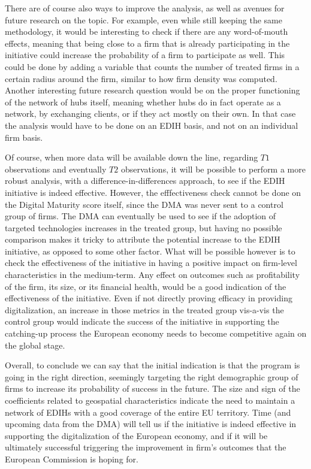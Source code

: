 \documentclass[12pt]{report}
\begin{document}
\par There are of course also ways to improve the analysis, as well as avenues for future research on the topic. For example, even while still keeping the same methodology, it would be interesting to check if there are any word-of-mouth effects, meaning that being close to a firm that is already participating in the initiative could increase the probability of a firm to participate as well. This could be done by adding a variable that counts the number of treated firms in a certain radius around the firm, similar to how firm density was computed. Another interesting future research question would be on the proper functioning of the network of hubs itself, meaning whether hubs do in fact operate as a network, by exchanging clients, or if they act mostly on their own. In that case the analysis would have to be done on an EDIH basis, and not on an individual firm basis. 
\par Of course, when more data will be available down the line, regarding $T1$ observations and eventually $T2$ observations, it will be possible to perform a more robust analysis, with a difference-in-differences approach, to see if the EDIH initiative is indeed effective. However, the efffectiveness check cannot be done on the Digital Maturity score itself, since the DMA was never sent to a control group of firms. The DMA can eventually be used to see if the adoption of targeted technologies increases in the treated group, but having no possible comparison makes it tricky to attribute the potential increase to the EDIH initiative, as opposed to some other factor.
What will be possible however is to check the effectiveness of the initiative in having a positive impact on firm-level characteristics in the medium-term. Any effect on outcomes such as profitability of the firm, its size, or its financial health, would be a good indication of the effectiveness of the initiative. Even if not directly proving efficacy in providing digitalization, an increase in those metrics in the treated group vis-a-vis the control group would indicate the success of the initiative in supporting the catching-up process the European economy needs to become competitive again on the global stage.
\par Overall, to conclude we can say that the initial indication is that the program is going in the right direction, seemingly targeting the right demographic group of firms to increase its probability of success in the future. The size and sign of the coefficients related to geospatial characteristics indicate the need to maintain a network of EDIHs with a good coverage of the entire EU territory. Time (and upcoming data from the DMA) will tell us if the initiative is indeed effective in supporting the digitalization of the European economy, and if it will be ultimately successful triggering the improvement in firm's outcomes that the European Commission is hoping for. 
\end{document}
